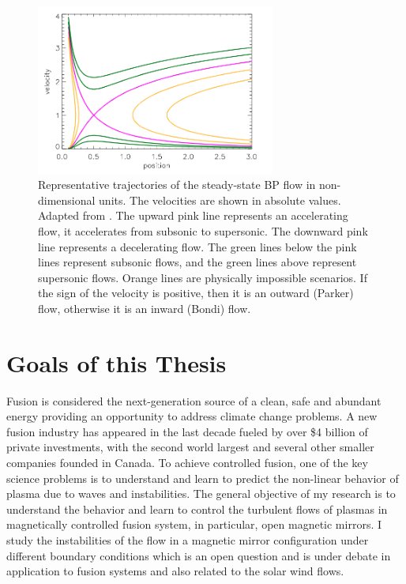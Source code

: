 \begin{figure}[htbp]
	\centering
	\includegraphics[width=0.7\textwidth]{figures/steady-state-BP-flow}
	\caption{Representative trajectories of the steady-state BP flow in non-dimensional units. The velocities are shown in absolute values. Adapted from \cite{keto_stability_2020}. The upward pink line represents an accelerating flow, it accelerates from subsonic to supersonic. The downward pink line represents a decelerating flow. The green lines below the pink lines represent subsonic flows, and the green lines above represent supersonic flows. Orange lines are physically impossible scenarios. If the sign of the velocity is positive, then it is an outward (Parker) flow, otherwise it is an inward (Bondi) flow.}
	\label{fig:BP-flow-velocity}
\end{figure}

\section{Goals of this Thesis}
Fusion is considered the next-generation source of a clean, safe and abundant energy providing an opportunity to address climate change problems. A new fusion industry has appeared in the last decade fueled by over \$4 billion of private investments, with the second world largest and several other smaller companies founded in Canada. To achieve controlled fusion, one of the key science problems is to understand and learn to predict the non-linear behavior of plasma due to waves and instabilities. The general objective of my research is to understand the behavior and learn to control the turbulent flows of plasmas in magnetically controlled fusion system, in particular, open magnetic mirrors. I study the instabilities of the flow in a magnetic mirror configuration under different boundary conditions which is an open question and is under debate in application to fusion systems and also related to the solar wind flows.

